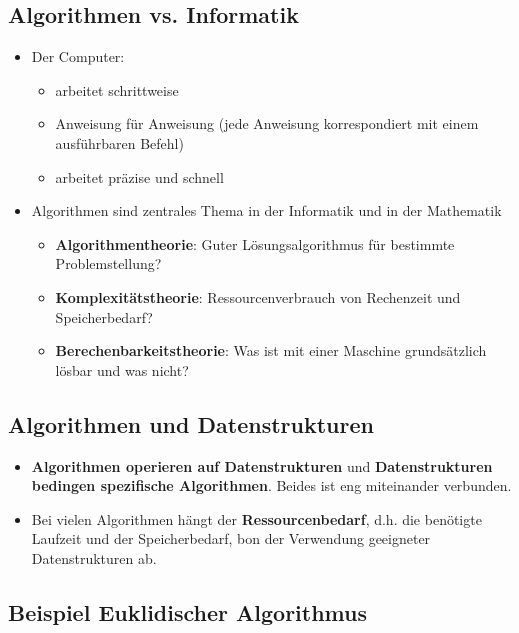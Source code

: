 \documentclass[10pt,a4paper]{article}
\begin{document}
\subsection{Algorithmen vs. Informatik}
\begin{itemize}[noitemsep,topsep=0pt,leftmargin=*]
    \item Der Computer:
    \begin{itemize}[noitemsep,topsep=0pt,leftmargin=*]
        \item arbeitet schrittweise
        \item Anweisung für Anweisung (jede Anweisung korrespondiert mit einem ausführbaren Befehl)
        \item arbeitet präzise und schnell
    \end{itemize}
    \item Algorithmen sind zentrales Thema in der Informatik und in der Mathematik
    \begin{itemize}[noitemsep,topsep=0pt,leftmargin=*]
        \item \textbf{Algorithmentheorie}: Guter Lösungsalgorithmus für bestimmte Problemstellung?
        \item \textbf{Komplexitätstheorie}: Ressourcenverbrauch von Rechenzeit und Speicherbedarf?
        \item \textbf{Berechenbarkeitstheorie}: Was ist mit einer Maschine grundsätzlich lösbar und was nicht?
    \end{itemize}
\end{itemize}

\subsection{Algorithmen und Datenstrukturen}
\begin{itemize}[noitemsep,topsep=0pt,leftmargin=*]
    \item \textbf{Algorithmen operieren auf Datenstrukturen} und \textbf{Datenstrukturen bedingen spezifische Algorithmen}. Beides ist eng miteinander verbunden.
    \item Bei vielen Algorithmen hängt der \textbf{Ressourcenbedarf}, d.h. die benötigte Laufzeit und der Speicherbedarf, bon der Verwendung geeigneter Datenstrukturen ab.
\end{itemize}

\subsection{Beispiel Euklidischer Algorithmus}
\end{document}
